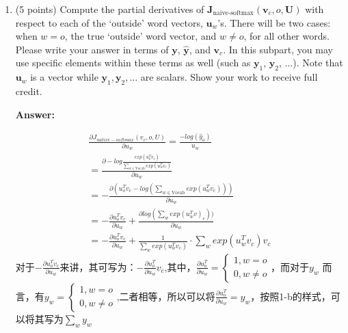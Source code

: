 \documentclass{article}
\newenvironment{answer}{
    {\bf Answer:} \sf \begingroup\color{red}
}{\endgroup}%
\begin{document}
\begin{enumerate}[label=(\alph*)]
\textbf{Hint:} Consider the case where $\mathbf{u}_x = \alpha\mathbf{u}_y$ for some words $x \neq y$ and some scalar $\alpha$. Give examples of words $x$ and $y$ which satisfy the given relation and why would they be affected/not affected due to the normalization?

\begin{shaded}
\begin{answer}
L2 正则化保留了向量的方向信息，但是丢失了向量的大小信息。

如题中所描述的若单词x是good，y是better，向量的长度可能影响着词向量的描述“good”的程度，此时就不适宜使用L2正则化

而如果单词x是good，y是bad，两个向量的长度并不重要，而其代表的“good”的方向相反，此时就适宜使用L2正则化。
\end{answer}
\end{shaded}

\item (5 points) Compute the partial derivatives of $\bm J_{\text{naive-softmax}}(\bm v_c, o, \bm U)$ with respect to each of the `outside' word vectors, $\bm u_w$'s. There will be two cases: when $w=o$, the true `outside' word vector, and $w \neq o$, for all other words. Please write your answer in terms of $\bm y$, $\hat{\bm y}$, and $\bm v_c$. In this subpart, you may use specific elements within these terms as well (such as $\bm y_1$, $\bm y_2$, $\dots$). Note that $\bm u_w$ is a vector while $\bm y_1, \bm y_2, \dots$ are scalars. Show your work to receive full credit.

\begin{shaded}
\begin{answer}
\begin{equation}
\begin{array}{l}
		\frac{\partial J_{native-softmax}(v_c,o,U)}{\partial u_w} = \frac{-log(\hat{y}_o)}{u_w} \\
		=\frac{\partial -log \frac{exp(u_o^T v_c)}{\sum_{w\in \text{Vocab}}exp(u_w^T v_c)}}{\partial u_w} \\
		= -\frac{\partial (u_o^T v_c - log(\sum_{w\in \text{Vocab}}	exp(u_w^T v_c)))}{\partial u_w} \\
		= -\frac{\partial u_o^T v_c}{\partial u_w} +\frac{\partial log(\sum_w exp(u_w^Tv)_c	))}{\partial u_w} \\
		= -\frac{\partial u_o^T v_c}{\partial u_w} +\frac{1}{\sum_w exp(u_w^T v_c)} \cdot \sum_w exp(u_w^T v_c) v_c
\end{array}
\end{equation}
对于$-\frac{\partial u_o^T v_c}{\partial u_w}$来讲，其可写为：$-\frac{\partial u_o^T}{\partial u_w} v_c$,其中，$\frac{\partial u_o^T}{\partial u_w} = \left\{\begin{array}{c}
	1 , w=o \\
	0 , w\neq o 
\end{array}\right.$，而对于$y_w$	而言，有$y_w = \left\{\begin{array}{c}
	1 , w=o \\
	0 , w\neq o 
\end{array}\right.$,二者相等，所以可以将$\frac{\partial u_o^T}{\partial u_w} = y_w$，按照1-b的样式，可以将其写为$\sum_w y_w$


\end{answer}
\end{shaded}
\end{enumerate}
\end{document}
